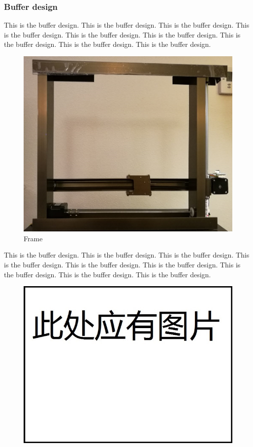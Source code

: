 \documentclass[12pt]{article}
\begin{document}
\begin{flushleft}
\subsubsection{Buffer design}
This is the buffer design. This is the buffer design. This is the buffer design. This is the buffer design. This is the buffer design. This is the buffer design. This is the buffer design. This is the buffer design. This is the buffer design. 
\begin{figure}[ht!]
	\begin{center}
		\includegraphics[scale = 0.8]{fram.png}
		\caption{Frame}
	\end{center}
\end{figure}
This is the buffer design. This is the buffer design. This is the buffer design. This is the buffer design. This is the buffer design. This is the buffer design. This is the buffer design. This is the buffer design. This is the buffer design. 
\begin{figure}[ht!]
	\begin{center}
		\includegraphics[scale = 0.6]{2D.jpg}

\end{center}
\end{figure}
\end{flushleft}
\end{document}
